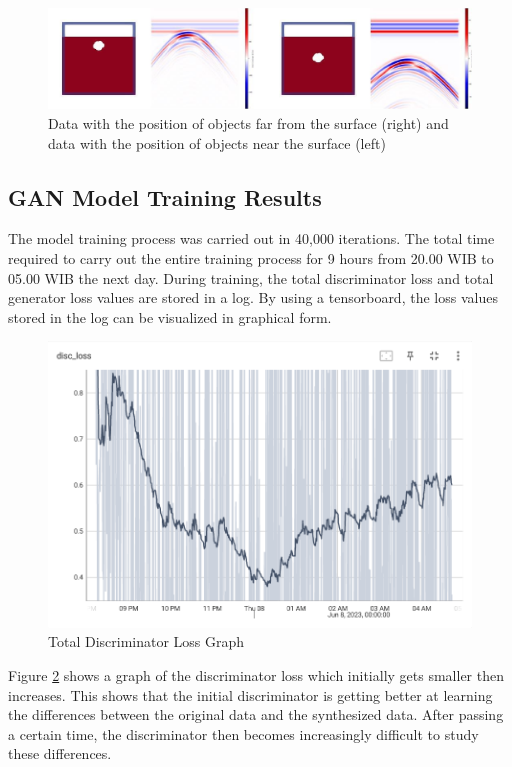 \documentclass[conference]{IEEEtran}
\begin{document}
\begin{figure}[ht]
  \centering
  \includegraphics[scale=0.2]{gambar/variasi kedalaman.png}
  \caption{Data with the position of objects far from the surface (right) and data with the position of objects near the surface (left)}
  \label{fig:posisiData}
\end{figure}

\subsection{GAN Model Training Results}

The model training process was carried out in 40,000 iterations.
The total time required to carry out the entire training process for 9 hours from 20.00 WIB to 05.00 WIB the next day.
During training, the total discriminator loss and total generator loss values are stored in a log.
By using a tensorboard, the loss values stored in the log can be visualized in graphical form.

\begin{figure}[ht]
  \centering
  \includegraphics[scale=0.4]{gambar/Disc_loss.png}
  \caption{Total Discriminator Loss Graph}
  \label{fig:discLoss}
\end{figure}

Figure \ref{fig:discLoss} shows a graph of the discriminator loss which initially gets smaller then increases.
This shows that the initial discriminator is getting better at learning the differences between the original data and the synthesized data.
After passing a certain time, the discriminator then becomes increasingly difficult to study these differences.
\end{document}
